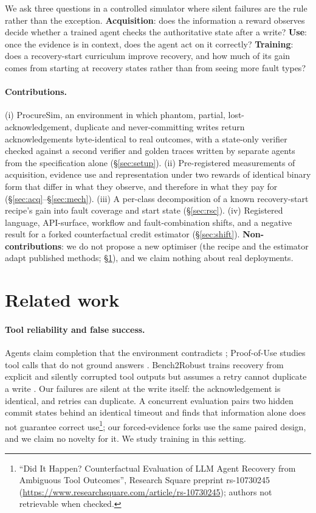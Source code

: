 \documentclass[11pt]{article}
\begin{document}
We ask three questions in a controlled simulator where silent failures are the rule rather than the exception. \textbf{Acquisition}: does the information a reward observes decide whether a trained agent checks the authoritative state after a write? \textbf{Use}: once the evidence is in context, does the agent act on it correctly? \textbf{Training}: does a recovery-start curriculum improve recovery, and how much of its gain comes from starting at recovery states rather than from seeing more fault types?

\paragraph{Contributions.} (i) ProcureSim, an environment in which phantom, partial, lost-acknowledgement, duplicate and never-committing writes return acknowledgements byte-identical to real outcomes, with a state-only verifier checked against a second verifier and golden traces written by separate agents from the specification alone (\S\ref{sec:setup}). (ii) Pre-registered measurements of acquisition, evidence use and representation under two rewards of identical binary form that differ in what they observe, and therefore in what they pay for (\S\ref{sec:acq}--\S\ref{sec:mech}). (iii) A per-class decomposition of a known recovery-start recipe's gain into fault coverage and start state (\S\ref{sec:rsc}). (iv) Registered language, API-surface, workflow and fault-combination shifts, and a negative result for a forked counterfactual credit estimator (\S\ref{sec:shift}). \textbf{Non-contributions}: we do not propose a new optimiser (the recipe and the estimator adapt published methods; \S\ref{sec:related}), and we claim nothing about real deployments.

\section{Related work}\label{sec:related}

\paragraph{Tool reliability and false success.} Agents claim completion that the environment contradicts \citep{smyth2026overclaim}; Proof-of-Use studies tool calls that do not ground answers \citep{ma2026proofofuse}. Bench2Robust trains recovery from explicit and silently corrupted tool outputs but assumes a retry cannot duplicate a write \citep{chen2026bench2robust}. Our failures are silent at the write itself: the acknowledgement is identical, and retries can duplicate. A concurrent evaluation pairs two hidden commit states behind an identical timeout and finds that information alone does not guarantee correct use\footnote{``Did It Happen? Counterfactual Evaluation of LLM Agent Recovery from Ambiguous Tool Outcomes'', Research Square preprint rs-10730245 (\url{https://www.researchsquare.com/article/rs-10730245}); authors not retrievable when checked.}; our forced-evidence forks use the same paired design, and we claim no novelty for it. We study training in this setting.
\end{document}
